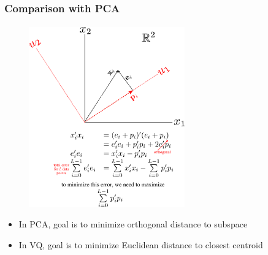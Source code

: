 \begin{frame}
\frametitle{Comparison with PCA}
\framesubtitle{}
\mypagenum
\begin{figure}		
\includegraphics[width=0.6\textwidth]{thesis/PRML_PCA_geometricDerivation_step1.pdf}			
\end{figure}
\begin{itemize}
\item In PCA, goal is to minimize orthogonal distance to subspace
\item In VQ, goal is to minimize Euclidean distance to closest centroid
\end{itemize}
\end{frame}







